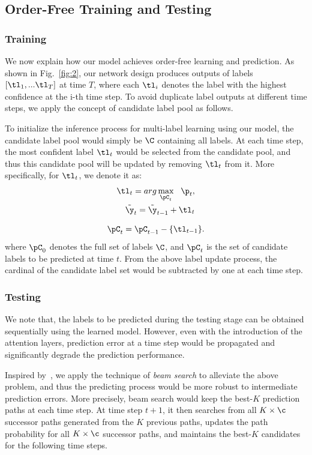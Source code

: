 \documentclass[letterpaper]{article} %
\begin{document}
\subsection{Order-Free Training and Testing}
\subsubsection{Training}

We now explain how our model achieves order-free learning and prediction. As shown in Fig.~\ref{fig:2}, our network design produces outputs of labels ${[\tl_1, ... \tl_T]}$ at time $T$, where each $\tl_i$ denotes the label with the highest confidence at the i-th time step. To avoid duplicate label outputs at different time steps, we apply the concept of candidate label pool as follows.

To initialize the inference process for multi-label learning using our model, the candidate label pool would simply be $\C$ containing all labels. At each time step, the most confident label $\tl_t$ would be selected from the candidate pool, and thus this candidate pool will be updated by removing $\tl_t$ from it. More specifically, for $\tl_t$, we denote it as:
\begin{equation}
\label{eq:max}
\begin{aligned}
\tl_t = arg\max_{\pC_t}~~\p_t, \\
\tilde{\y}_t = \tilde{\y}_{t-1} + \tl_t
\end{aligned}
\end{equation}

\begin{equation}
\label{eq:cand_pool}
\pC_t = \pC_{t-1} - \{\tl_{t-1}\}.
\end{equation}
where $\pC_0$ denotes the full set of labels $\C$, and $\pC_t$ is the set of candidate labels to be predicted at time $t$. From the above label update process, the cardinal of the candidate label set would be subtracted by one at each time step.

\subsubsection{Testing}
We note that, the labels to be predicted during the testing stage can be obtained sequentially using the learned model. However, even with the introduction of the attention layers, prediction error at a time step would be propagated and significantly degrade the prediction performance.

Inspired by~\cite{wang2016cnn}, we apply the technique of \emph{beam search} to alleviate the above problem, and thus the predicting process would be more robust to intermediate prediction errors. More precisely, beam search would keep the best-$K$ prediction paths at each time step. At time step $t+1$, it then searches from all $K\times \c$ successor paths generated from the $K$ previous paths, updates the path probability for all $K\times \c$ successor paths, and maintains the best-$K$ candidates for the following time steps.
\end{document}
